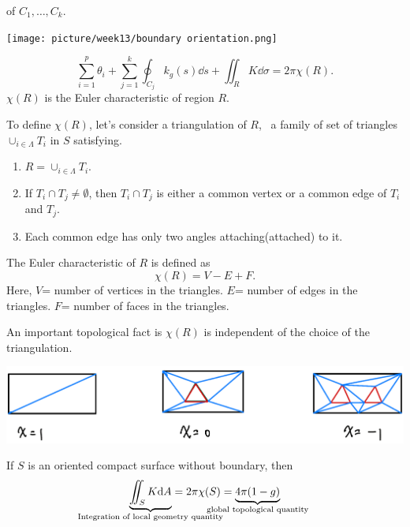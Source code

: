 \begin{enumerate}[(1)]
\begin{itemize}
        of \(C_1,\ldots,C_k\).
    \end{itemize}
    \begin{center}
        \texttt{[image: picture/week13/boundary
        orientation.png]}
    \end{center}
    \begin{theorem}
        \[\sum_{i=1}^p\theta_i+\sum_{j=1}^k\oint_{C_j}k_g(s)\dd s
        +\iint_{R}K\dd \sigma =2\pi \chi(R).\]
        \(\chi(R)\) is the Euler characteristic of region \(R\).
    \end{theorem}
    To define \(\chi(R)\), let's consider a triangulation of \(R\),
    \ie\ a family of set of triangles \(\cup_{i\in\Lambda}T_i\)
    in \(S\) satisfying.
    \begin{enumerate}[(1)]
        \item \(R=\cup_{i\in\Lambda}T_i\).
        \item If \(T_i\cap T_j\neq \emptyset\), then \(T_i\cap T_j\)
        is either a common vertex or a common edge of \(T_i\) and
        \(T_j\).
        \item Each common edge has only two angles attaching(attached)
        to it.
    \end{enumerate}
    \begin{definition}
        The Euler characteristic of \(R\) is defined as 
        \[\chi(R)=V-E+F.\]
        Here, \(V\)= number of vertices in the triangles. 
        \(E\)= number of edges in the triangles. 
        \(F\)= number of faces in the triangles.
    \end{definition}
    An important topological fact is \(\chi(R)\) is independent of the
    choice of the triangulation.
    \begin{center}
        \includegraphics[scale=0.35]{picture/week13/euler number.png}
    \end{center}
    \begin{corollary}
        If \(S\) is an oriented compact surface without boundary, then
        \[
            \underbrace{\iint_S K\dd A}_{\mathclap{
                \text{Integration of local geometry quantity}}   
            }=2\pi \chi(S)=
            \underbrace{4\pi(1-g)}_{\mathclap{
                \text{global topological quantity}
}}\]
\end{corollary}
\end{enumerate}
